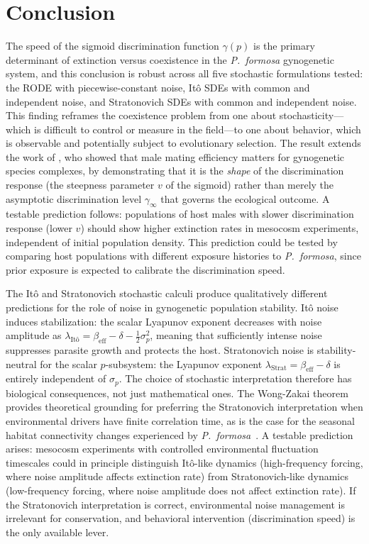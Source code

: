 \documentclass[12pt]{article}
\begin{document}
\section{Conclusion}

The speed of the sigmoid discrimination function $\gamma(p)$ is the primary determinant of extinction versus coexistence in the \textit{P.~formosa} gynogenetic system, and this conclusion is robust across all five stochastic formulations tested: the RODE with piecewise-constant noise, It\^{o} SDEs with common and independent noise, and Stratonovich SDEs with common and independent noise.  This finding reframes the coexistence problem from one about stochasticity---which is difficult to control or measure in the field---to one about behavior, which is observable and potentially subject to evolutionary selection.  The result extends the work of \citet{Heubel2009}, who showed that male mating efficiency matters for gynogenetic species complexes, by demonstrating that it is the \emph{shape} of the discrimination response (the steepness parameter $v$ of the sigmoid) rather than merely the asymptotic discrimination level $\gamma_\infty$ that governs the ecological outcome.  A testable prediction follows: populations of host males with slower discrimination response (lower $v$) should show higher extinction rates in mesocosm experiments, independent of initial population density.  This prediction could be tested by comparing host populations with different exposure histories to \textit{P.~formosa}, since prior exposure is expected to calibrate the discrimination speed.

The It\^{o} and Stratonovich stochastic calculi produce qualitatively different predictions for the role of noise in gynogenetic population stability.  It\^{o} noise induces stabilization: the scalar Lyapunov exponent decreases with noise amplitude as $\lambda_{\text{It\^{o}}} = \beta_{\text{eff}} - \delta - \tfrac{1}{2}\sigma_p^2$, meaning that sufficiently intense noise suppresses parasite growth and protects the host.  Stratonovich noise is stability-neutral for the scalar $p$-subsystem: the Lyapunov exponent $\lambda_{\text{Strat}} = \beta_{\text{eff}} - \delta$ is entirely independent of $\sigma_p$.  The choice of stochastic interpretation therefore has biological consequences, not just mathematical ones.  The Wong-Zakai theorem provides theoretical grounding for preferring the Stratonovich interpretation when environmental drivers have finite correlation time, as is the case for the seasonal habitat connectivity changes experienced by \textit{P.~formosa}~\citep{Oksendal2003}.  A testable prediction arises: mesocosm experiments with controlled environmental fluctuation timescales could in principle distinguish It\^{o}-like dynamics (high-frequency forcing, where noise amplitude affects extinction rate) from Stratonovich-like dynamics (low-frequency forcing, where noise amplitude does not affect extinction rate).  If the Stratonovich interpretation is correct, environmental noise management is irrelevant for conservation, and behavioral intervention (discrimination speed) is the only available lever.
\end{document}
